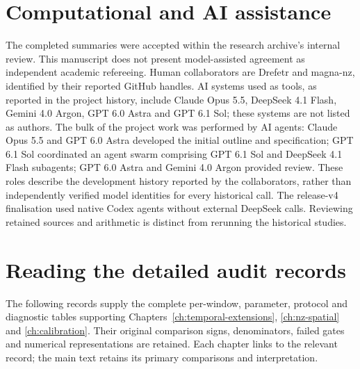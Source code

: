 \section{Computational and AI assistance}\label{sec:ai-assistance}
The completed summaries were accepted within the research archive's internal review. This manuscript does not present model-assisted agreement as independent academic refereeing. Human collaborators are Drefetr and magna-nz, identified by their reported GitHub handles. AI systems used as tools, as reported in the project history, include Claude Opus 5.5, DeepSeek 4.1 Flash, Gemini 4.0 Argon, GPT 6.0 Astra and GPT 6.1 Sol; these systems are not listed as authors. The bulk of the project work was performed by AI agents: Claude Opus 5.5 and GPT 6.0 Astra developed the initial outline and specification; GPT 6.1 Sol coordinated an agent swarm comprising GPT 6.1 Sol and DeepSeek 4.1 Flash subagents; GPT 6.0 Astra and Gemini 4.0 Argon provided review. These roles describe the development history reported by the collaborators, rather than independently verified model identities for every historical call. The release-v4 finalisation used native Codex agents without external DeepSeek calls. Reviewing retained sources and arithmetic is distinct from rerunning the historical studies.



\section{Reading the detailed audit records}
The following records supply the complete per-window, parameter, protocol and diagnostic tables supporting Chapters~\ref{ch:temporal-extensions}, \ref{ch:nz-spatial} and \ref{ch:calibration}. Their original comparison signs, denominators, failed gates and numerical representations are retained. Each chapter links to the relevant record; the main text retains its primary comparisons and interpretation.




